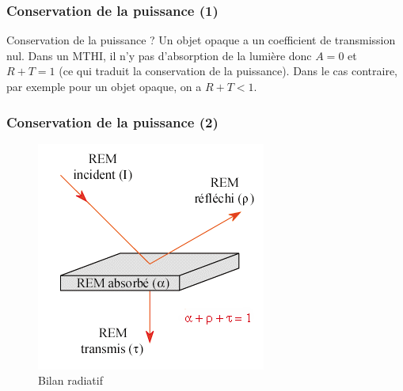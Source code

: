 \documentclass{beamercours}
\begin{document}
\begin{frame}
\frametitle{Conservation de la puissance (1)}
\begin{remarque}{Conservation de la puissance ?}{}
	Un objet opaque a un coefficient de transmission nul.
	Dans un MTHI, il n'y pas d'absorption de la lumière donc $A = 0$ et $R + T = 1$ (ce qui traduit la conservation de la puissance).
	Dans le cas contraire, par exemple pour un objet opaque, on a $R + T < 1$.
\end{remarque}
\end{frame}
\begin{frame}
\frametitle{Conservation de la puissance (2)}
\begin{figure}[H]
\centering
	\begin{minipage}[c]{.6\textwidth}
		\includegraphics[width=\linewidth]{BilanRadiatif}
	\end{minipage}
	\begin{minipage}{.1\textwidth}

	\end{minipage}
	\begin{minipage}[c]{.3\textwidth}
		\caption{Bilan radiatif}
	\end{minipage}
\end{figure}

\end{frame}
\end{document}

